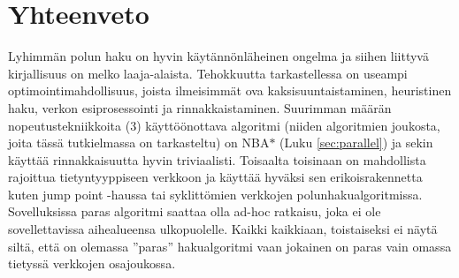 \documentclass[finnish]{tktltiki2}
\theoremstyle{definition}
\theoremstyle{remark}
\begin{document}
\section{Yhteenveto}
Lyhimmän polun haku on hyvin käytännönläheinen ongelma ja siihen liittyvä kirjallisuus on melko laaja-alaista. Tehokkuutta tarkastellessa on useampi optimointimahdollisuus, joista ilmeisimmät ova kaksisuuntaistaminen, heuristinen haku, verkon esiprosessointi ja rinnakkaistaminen. Suurimman määrän nopeutustekniikkoita (3) käyttöönottava algoritmi (niiden algoritmien joukosta, joita tässä tutkielmassa on tarkasteltu) on NBA$\ast$ (Luku \ref{sec:parallel}) ja sekin käyttää rinnakkaisuutta hyvin triviaalisti. Toisaalta toisinaan on mahdollista rajoittua tietyntyyppiseen verkkoon ja käyttää hyväksi sen erikoisrakennetta kuten jump point -haussa tai syklittömien verkkojen polunhakualgoritmissa. Sovelluksissa paras algoritmi saattaa olla ad-hoc ratkaisu, joka ei ole sovellettavissa aihealueensa ulkopuolelle. Kaikki kaikkiaan, toistaiseksi ei näytä siltä, että on olemassa ''paras'' hakualgoritmi vaan jokainen on paras vain omassa tietyssä verkkojen osajoukossa.







% 
\end{document}
